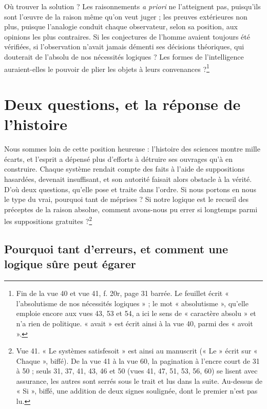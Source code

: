 \documentclass[11pt,a4paper]{article}
\begin{document}
Où trouver la solution ? Les raisonnements \emph{a priori} ne l'atteignent pas,
puisqu'ils sont l'œuvre de la raison même qu'on veut juger ; les preuves
extérieures non plus, puisque l'analogie conduit chaque observateur, selon sa
position, aux opinions les plus contraires. Si les conjectures de l'homme
avaient toujours été vérifiées, si l'observation n'avait jamais démenti ses
décisions théoriques, qui douterait de l'absolu de nos nécessités logiques ?
Les formes de l'intelligence auraient-elles le pouvoir de plier les objets à
leurs convenances ?\footnote{Fin de la vue 40 et vue 41, f. 20r, page 31
barrée. Le feuillet écrit « l'absolutisme de nos nécessités logiques » ; le mot
« absolutisme », qu'elle emploie encore aux vues 43, 53 et 54, a ici le sens de
« caractère absolu » et n'a rien de politique. « avait » est écrit ainsi à la
vue 40, parmi des « avoit ».}

\section*{Deux questions, et la réponse de l'histoire}

Nous sommes loin de cette position heureuse : l'histoire des sciences montre
mille écarts, et l'esprit a dépensé plus d'efforts à détruire ses ouvrages qu'à
en construire. Chaque système rendait compte des faits à l'aide de suppositions
hasardées, devenait insuffisant, et son autorité faisait alors obstacle à la
vérité. D'où deux questions, qu'elle pose et traite dans l'ordre. Si nous
portons en nous le type du vrai, pourquoi tant de méprises ? Si notre logique
est le recueil des préceptes de la raison absolue, comment avons-nous pu errer
si longtemps parmi les suppositions gratuites ?\footnote{Vue 41. « Le systèmes
satisfesoit » est ainsi au manuscrit (« Le » écrit sur « Chaque », biffé).
De la vue 41 à la vue 60, la pagination à l'encre court de 31 à 50 ; seuls
31, 37, 41, 43, 46 et 50 (vues 41, 47, 51, 53, 56, 60) se lisent avec
assurance, les autres sont serrés sous le trait et lus dans la suite. 
Au-dessus de « Si », biffé, une addition de deux signes soulignée, dont le premier
n'est pas lu.}

\subsection*{Pourquoi tant d'erreurs, et comment une logique sûre peut égarer}
\end{document}
